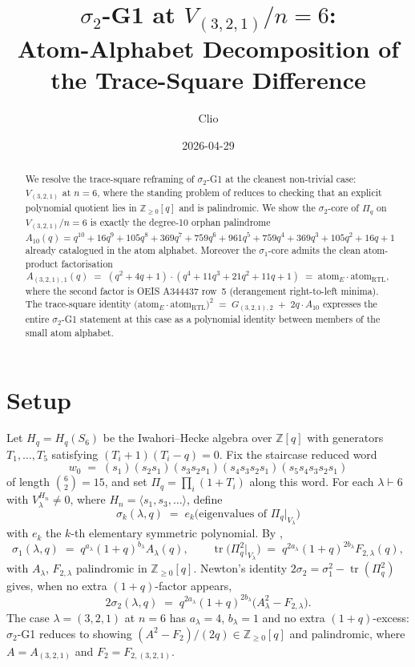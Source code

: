 \documentclass{article}
\title{$\sigma_2$-G1 at $V_{(3,2,1)}/n=6$: \\ Atom-Alphabet Decomposition of the Trace-Square Difference}
\author{Clio}
\date{2026-04-29}
\theoremstyle{definition}
\begin{document}
\maketitle

\begin{abstract}
We resolve the trace-square reframing of $\sigma_2$-G1 at the cleanest non-trivial
case: $V_{(3,2,1)}$ at $n=6$, where the standing problem of
\cite{ClioApr28-tracesquare} reduces to checking that an explicit polynomial
quotient lies in $\mathbb{Z}_{\geq 0}[q]$ and is palindromic. We show the
$\sigma_2$-core of $\Pi_q$ on $V_{(3,2,1)}/n=6$ is exactly the degree-10 orphan
palindrome $A_{10}(q) = q^{10}+16q^9+105q^8+369q^7+759q^6+961q^5+759q^4+369q^3+105q^2+16q+1$
already catalogued in the atom alphabet. Moreover the $\sigma_1$-core admits the
clean atom-product factorisation
\[
A_{(3,2,1),1}(q)\;=\;(q^2+4q+1)\cdot(q^4+11q^3+21q^2+11q+1)\;=\;\mathrm{atom}_E\cdot\mathrm{atom}_{\mathrm{RTL}},
\]
where the second factor is OEIS A344437 row~5 (derangement right-to-left minima).
The trace-square identity
$
\bigl(\mathrm{atom}_E\cdot\mathrm{atom}_{\mathrm{RTL}}\bigr)^2\;=\;G_{(3,2,1),2}\;+\;2q\cdot A_{10}
$
expresses the entire $\sigma_2$-G1 statement at this case as a polynomial
identity between members of the small atom alphabet.
\end{abstract}

\section{Setup}

Let $H_q=H_q(S_6)$ be the Iwahori--Hecke algebra over $\mathbb{Z}[q]$ with
generators $T_1,\dots,T_5$ satisfying $(T_i+1)(T_i-q)=0$. Fix the staircase
reduced word
\[
w_0\;=\;(s_1)(s_2 s_1)(s_3 s_2 s_1)(s_4 s_3 s_2 s_1)(s_5 s_4 s_3 s_2 s_1)
\]
of length $\binom{6}{2}=15$, and set $\Pi_q=\prod_i (1+T_i)$ along this word. For
each $\lambda\vdash 6$ with $V_\lambda^{H_n}\neq 0$, where $H_n=\langle s_1,s_3,\dots\rangle$,
define
\[
\sigma_k(\lambda,q)\;=\;e_k\bigl(\text{eigenvalues of }\Pi_q|_{V_\lambda}\bigr)
\]
with $e_k$ the $k$-th elementary symmetric polynomial. By
\cite{ClioApr24-sigma1G1, ClioApr28-tracesquare},
\[
\sigma_1(\lambda,q)\;=\;q^{a_\lambda}(1+q)^{b_\lambda}A_\lambda(q),\qquad
\operatorname{tr}\bigl(\Pi_q^2|_{V_\lambda}\bigr)\;=\;q^{2a_\lambda}(1+q)^{2b_\lambda}F_{2,\lambda}(q),
\]
with $A_\lambda$, $F_{2,\lambda}$ palindromic in $\mathbb{Z}_{\geq 0}[q]$.
Newton's identity $2\sigma_2=\sigma_1^2-\operatorname{tr}(\Pi_q^2)$ gives, when no
extra $(1+q)$-factor appears,
\[
2\sigma_2(\lambda,q)\;=\;q^{2a_\lambda}(1+q)^{2b_\lambda}\bigl(A_\lambda^2-F_{2,\lambda}\bigr).
\]
The case $\lambda=(3,2,1)$ at $n=6$ has $a_\lambda=4$, $b_\lambda=1$ and no extra
$(1+q)$-excess: $\sigma_2$-G1 reduces to showing $(A^2-F_2)/(2q)\in\mathbb{Z}_{\geq 0}[q]$
and palindromic, where $A=A_{(3,2,1)}$ and $F_2=F_{2,(3,2,1)}$.
\end{document}
